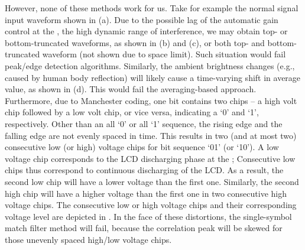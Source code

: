 However, none of these methods work for us. 
Take for example the normal signal input waveform shown in (a). 
Due to the possible lag of the automatic gain control at the \readerrx, the high dynamic range of interference, we may obtain top- or bottom-truncated waveforms, as shown in (b) and (c), or both top- and bottom-truncated waveform (not shown due to space limit). Such situation would fail peak/edge detection algorithms. Similarly, the ambient brightness changes (e.g., caused by human body reflection) will likely cause a time-varying shift in average value, as shown in (d). This would fail the averaging-based approach. Furthermore, due to Manchester coding, one bit contains two chips -- a high volt chip followed by a low volt chip, or vice versa, indicating a `0' and `1', respectively. Other than an all `0' or all `1' sequence, the rising edge and the falling edge are not evenly spaced in time. %
This results in two (and at most two) consecutive low (or high) voltage chips for bit sequence `01' (or `10'). 
A low voltage chip corresponds to the LCD discharging phase at the \vitag; Consecutive low chips thus correspond to continuous discharging of the LCD. As a result, the second low chip will have a lower voltage than the first one. Similarly, the second high chip will have a higher voltage than the first one in two consecutive high voltage chips. The consecutive low or high voltage chips and their corresponding voltage level are depicted in . 
In the face of these distortions, the single-symbol match filter method will fail, because the correlation peak will be skewed for those unevenly spaced high/low voltage chips.




